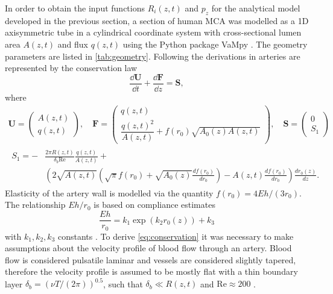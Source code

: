 \documentclass[a4paper,titlepage]{scrartcl}
\begin{document}
In order to obtain the input functions $R_i(z,t)$ and $p_z$ for the analytical model developed in the previous section, a section of human MCA was modelled as a 1D axisymmetric tube in a cylindrical coordinate system with cross-sectional lumen area $A(z,t)$ and flux $q(z,t)$ using the Python package VaMpy \cite{Diem2016a}. The geometry parameters are listed in \autoref{tab:geometry}. Following the derivations in \cite{Olufsen2000,Diem2016} arteries are represented by the conservation law
\begin{equation}
  \frac{\dd \boldsymbol{U}}{\dd t} + \frac{\dd \boldsymbol{F}}{\dd z} = \boldsymbol{S}, \label{eq:conservation}
\end{equation}
where
\begin{gather*}
  \boldsymbol{U} = \begin{pmatrix} A(z,t) \\ q(z,t) \end{pmatrix}, \quad \boldsymbol{F} = \begin{pmatrix} q(z,t)\\ \dfrac{q(z,t)^2}{A(z,t)} + f(r_0) \sqrt{A_0(z) A(z,t)} \end{pmatrix}, \quad \boldsymbol{S} = \begin{pmatrix} 0\\ S_1 \end{pmatrix}\\
  \begin{split}
    S_1 = -&\frac{2 \pi R(z,t)}{\delta_b \mathrm{Re}} \frac{q(z,t)}{A(z,t)} +\\
    &\left( 2 \sqrt{A(z,t)} \left( \sqrt{\pi} f(r_0) + \sqrt{A_0(z)} \frac{df(r_0)}{dr_0 } \right) - A(z,t) \frac{df(r_0)}{dr_0} \right) \frac{dr_0(z)}{dz}.
  \end{split}
\end{gather*}
Elasticity of the artery wall is modelled via the quantity $f(r_0) = 4Eh/(3r_0)$. The relationship $Eh/r_0$ is based on compliance estimates
\begin{equation}
  \frac{Eh}{r_0} = k_1 \exp \left( k_2 r_0(z) \right) + k_3
\end{equation}
with $k_1, k_2, k_3$ constants \cite{Olufsen2000}. To derive \eqref{eq:conservation} it was necessary to make assumptions about the velocity profile of blood flow through an artery. Blood flow is considered pulsatile laminar and vessels are considered slightly tapered, therefore the velocity profile is assumed to be mostly flat with a thin boundary layer $\delta_b = (\nu T/(2\pi))^{0.5}$, such that $\delta_b \ll R(z,t)$ and $\text{Re} \approx 200$ \cite{Olufsen2000}.
\end{document}
